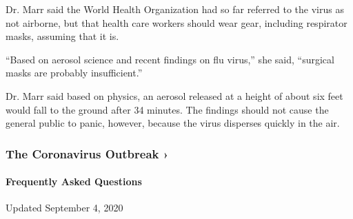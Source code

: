 Dr. Marr said the World Health Organization had so far referred to the
virus as not airborne, but that health care workers should wear gear,
including respirator masks, assuming that it is.

``Based on aerosol science and recent findings on flu virus,'' she said,
``surgical masks are probably insufficient.''

Dr. Marr said based on physics, an aerosol released at a height of about
six feet would fall to the ground after 34 minutes. The findings should
not cause the general public to panic, however, because the virus
disperses quickly in the air.

\href{https://www.nytimes3xbfgragh.onion/news-event/coronavirus?action=click\&pgtype=Article\&state=default\&region=MAIN_CONTENT_3\&context=storylines_faq}{}

\hypertarget{the-coronavirus-outbreak-}{%
\subsubsection{The Coronavirus Outbreak
›}\label{the-coronavirus-outbreak-}}

\hypertarget{frequently-asked-questions}{%
\paragraph{Frequently Asked
Questions}\label{frequently-asked-questions}}

Updated September 4, 2020

